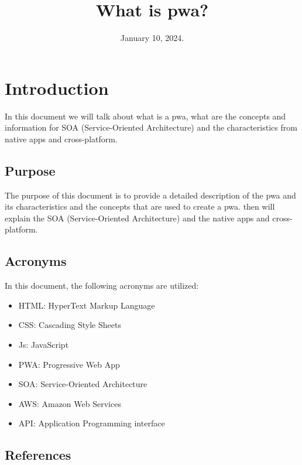 \documentclass[12pt,a4paper, twosite]{article}
\date{January 10, 2024.}
\title{What is pwa?}
\begin{document}
\maketitle

\newpage
\tableofcontents

\newpage

\section{Introduction}
\label{sec:org60390fa}

In this document we will talk about what is a pwa, what are the concepts and information for SOA (Service-Oriented Architecture) and the characteristics from native apps and cross-platform.


\subsection{Purpose}
\label{sec:org434c3ef}

The purpose of this document is to provide a detailed description of the pwa and its characteristics
and the concepts that are used to create a pwa. then will explain the SOA (Service-Oriented Architecture) and the native apps and cross-platform.


\subsection{Acronyms}
\label{sec:orgb158e36}

In this document, the following  acronyms are utilized:
\begin{itemize}
\item HTML: HyperText Markup Language
\item CSS: Cascading Style Sheets
\item Js: JavaScript
\item PWA: Progressive Web App
\item SOA: Service-Oriented Architecture
\item AWS: Amazon Web Services
\item API: Application Programming interface
\end{itemize}

\subsection{References}
\label{sec:org62711e0}
\end{document}
